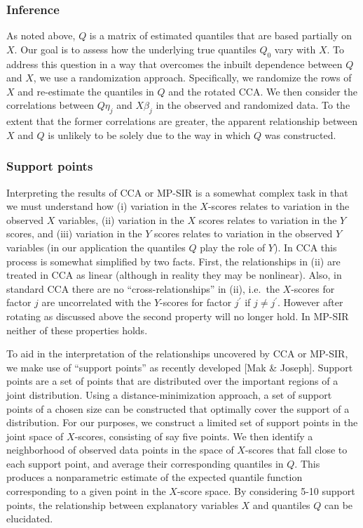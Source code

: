 \subsubsection{Inference}

As noted above, $Q$ is a matrix of estimated quantiles that are based
partially on $X$.  Our goal is to assess how the underlying true quantiles
$Q_0$ vary with $X$.  To address this question in a way that overcomes the
inbuilt dependence between $Q$ and $X$, we use a randomization approach.
Specifically, we randomize the rows of $X$ and re-estimate the quantiles
in $Q$ and the rotated CCA.  We then consider the correlations between
$Q\eta_j$ and $X\beta_j$ in the observed and randomized data.  To the
extent that the former correlations are greater, the apparent relationship
between $X$ and $Q$ is unlikely to be solely due to the way in which $Q$
was constructed.

\subsubsection{Support points}

Interpreting the results of CCA or MP-SIR is a somewhat complex task
in that we must understand how (i) variation in the $X$-scores relates
to variation in the observed $X$ variables, (ii) variation in the $X$
scores relates to variation in the $Y$ scores, and (iii) variation in
the $Y$ scores relates to variation in the observed $Y$ variables (in
our application the quantiles $Q$ play the role of $Y$).  In CCA this
process is somewhat simplified by two facts.  First, the relationships
in (ii) are treated in CCA as linear (although in reality they may be
nonlinear).  Also, in standard CCA there are no ``cross-relationships''
in (ii), i.e.\ the $X$-scores for factor $j$ are uncorrelated with the
$Y$-scores for factor $j^\prime$ if $j \ne j^\prime$.  However after
rotating as discussed above the second property will no longer hold.
In MP-SIR neither of these properties holds.

To aid in the interpretation of the relationships uncovered by CCA
or MP-SIR, we make use of ``support points'' as recently developed
[Mak & Joseph].  Support points are a set of points that are
distributed over the important regions of a joint distribution.
Using a distance-minimization approach, a set of support points of a
chosen size can be constructed that optimally cover the support of a
distribution.  For our purposes, we construct a limited set of support
points in the joint space of $X$-scores, consisting of say five points.
We then identify a neighborhood of observed data points in the space
of $X$-scores that fall close to each support point, and average their
corresponding quantiles in $Q$.  This produces a nonparametric estimate
of the expected quantile function corresponding to a given point in the
$X$-score space.  By considering 5-10 support points, the relationship
between explanatory variables $X$ and quantiles $Q$ can be elucidated.

